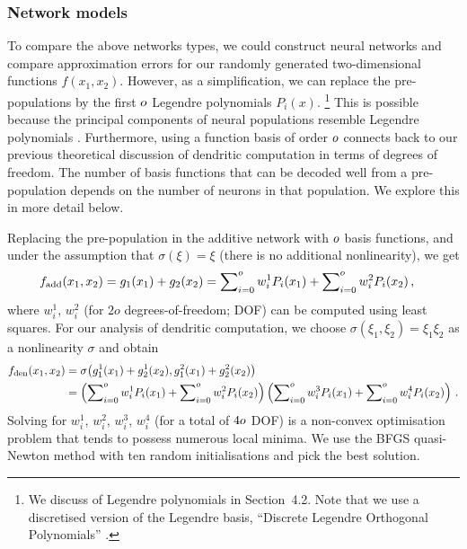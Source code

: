\subsubsection{Network models}
To compare the above networks types, we could construct neural networks and compare approximation errors for our randomly generated two-dimensional functions $f(x_1, x_2)$.
However, as a simplification, we can replace the pre-populations by the first $o$ Legendre polynomials $P_i(x)$.%
\footnote{We discuss of Legendre polynomials in Section~4.2. Note that we use a discretised version of the Legendre basis, \enquote{Discrete Legendre Orthogonal Polynomials} \citep[DLOPs;][]{neuman1974discrete,stockel2021discrete}.}
This is possible because the principal components of neural populations resemble Legendre polynomials \citep[Chapter~7]{eliasmith2003neural}.
Furthermore, using a function basis of order $o$ connects back to our previous theoretical discussion of dendritic computation in terms of degrees of freedom.
The number of basis functions that can be decoded well from a pre-population depends on the number of neurons in that population.
We explore this in more detail below.

Replacing the pre-population in the additive network with $o$ basis functions, and under the assumption that $\sigma(\xi) = \xi$ (there is no additional nonlinearity), we get
\begin{align}
	f_\mathrm{add}(x_1, x_2) &= g_1(x_1) + g_2(x_2) = \sum\nolimits_{i = 0}^{o} w^1_{i} P_i(x_1) + \sum\nolimits_{i = 0}^{o} w^2_{i} P_i(x_2) \,,
	\label{eqn:f_add}
\end{align}
where $w_i^1$, $w_i^2$ (for $2o$ degrees-of-freedom; DOF) can be computed using least squares.
For our analysis of dendritic computation, we choose $\sigma(\xi_1, \xi_2) = \xi_1 \xi_2$ as a nonlinearity $\sigma$ and obtain
\begin{align}
	\begin{aligned}
		f_\mathrm{den}(x_1, x_2)
			&= \sigma\big(g^1_1(x_1) + g^1_2(x_2), g^2_1(x_1) + g^2_2(x_2)\big) \\
			&= \left( \sum\nolimits_{i = 0}^{o} w^1_{i} P_i(x_1) + \sum\nolimits_{i = 0}^{o} w^2_{i} P_i(x_2) \right)
			   \left( \sum\nolimits_{i = 0}^{o} w^3_{i} P_i(x_1) + \sum\nolimits_{i = 0}^{o} w^4_{i} P_i(x_2) \right)  \,.
	\end{aligned}
	\label{eqn:f_den}
\end{align}
Solving for $w^1_{i}$, $w^2_{i}$, $w^3_{i}$, $w^4_{i}$ (for a total of $4o$ DOF) is a non-convex optimisation problem that tends to possess numerous local minima.
We use the BFGS quasi-Newton method \citep[Chapter~8]{nocedal2006numerical} with ten random initialisations and pick the best solution.

